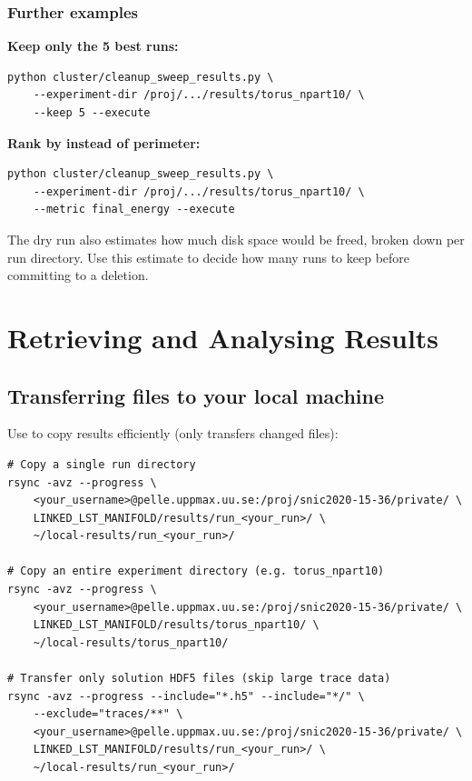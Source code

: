 \documentclass[11pt,a4paper]{article}
\begin{document}
\subsubsection{Further examples}

\textbf{Keep only the 5 best runs:}
\begin{lstlisting}[style=shell]
python cluster/cleanup_sweep_results.py \
    --experiment-dir /proj/.../results/torus_npart10/ \
    --keep 5 --execute
\end{lstlisting}

\textbf{Rank by  instead of perimeter:}
\begin{lstlisting}[style=shell]
python cluster/cleanup_sweep_results.py \
    --experiment-dir /proj/.../results/torus_npart10/ \
    --metric final_energy --execute
\end{lstlisting}

\begin{notebox}
The dry run also estimates how much disk space would be freed, broken down
per run directory.  Use this estimate to decide how many runs to keep before
committing to a deletion.
\end{notebox}

\section{Retrieving and Analysing Results}

\subsection{Transferring files to your local machine}

Use \code{rsync} to copy results efficiently (only transfers changed files):

\begin{lstlisting}[style=shell]
# Copy a single run directory
rsync -avz --progress \
    <your_username>@pelle.uppmax.uu.se:/proj/snic2020-15-36/private/ \
    LINKED_LST_MANIFOLD/results/run_<your_run>/ \
    ~/local-results/run_<your_run>/

# Copy an entire experiment directory (e.g. torus_npart10)
rsync -avz --progress \
    <your_username>@pelle.uppmax.uu.se:/proj/snic2020-15-36/private/ \
    LINKED_LST_MANIFOLD/results/torus_npart10/ \
    ~/local-results/torus_npart10/

# Transfer only solution HDF5 files (skip large trace data)
rsync -avz --progress --include="*.h5" --include="*/" \
    --exclude="traces/**" \
    <your_username>@pelle.uppmax.uu.se:/proj/snic2020-15-36/private/ \
    LINKED_LST_MANIFOLD/results/run_<your_run>/ \
    ~/local-results/run_<your_run>/
\end{lstlisting}
\end{document}
